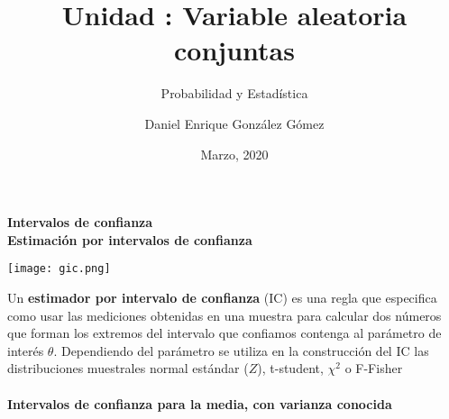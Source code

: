 \documentclass[base=hide,12pt]{elegantbook}
\title{Unidad : Variable aleatoria conjuntas}
\subtitle{Probabilidad y Estadística}
\author{Daniel Enrique González Gómez}
\institute{Pontificia Universidad Javeriana Cali}
\date{Marzo, 2020}
\begin{document}
\textcolor{col4}{\LARGE \bf Intervalos de confianza} \\
\vspace{1cm} 
\textcolor{col4}{\bf \large Estimación por intervalos de confianza}\\
	\begin{center}
		\texttt{[image: gic.png]}
	\end{center}
Un {\bf estimador por intervalo de confianza} (IC) es una regla que especifica como usar las mediciones obtenidas en una muestra para calcular dos números que forman los extremos del intervalo que confiamos contenga al parámetro de interés $\theta$. Dependiendo del parámetro se utiliza en la construcción del IC las distribuciones muestrales normal estándar ($Z$), t-student, $\chi^{2}$ o F-Fisher \\ \\
\textcolor{col4}{\bf \large Intervalos de confianza para la media, con varianza conocida}\\
\end{document}

